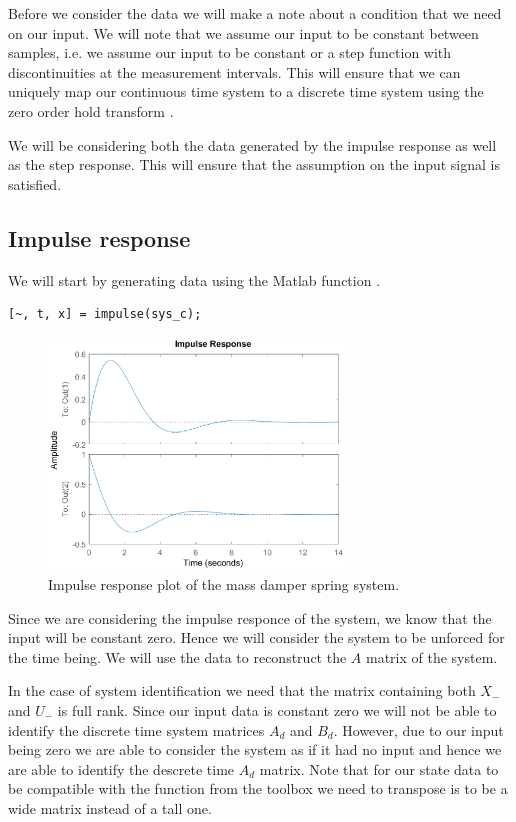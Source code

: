 Before we consider the data we will make a note about a condition that we need on our input. We will note that we assume our input to be constant between samples, i.e. we assume our input to be constant or a step function with discontinuities at the measurement intervals. This will ensure that we can uniquely map our continuous time system to a discrete time system using the zero order hold transform \cite{kollar1996equivalence}. 

We will be considering both the data generated by the impulse response as well as the step response. This will ensure that the assumption on the input signal is satisfied.

\subsection{Impulse response}
We will start by generating data using the Matlab function .

\begin{lstlisting}
[~, t, x] = impulse(sys_c);
\end{lstlisting}

\begin{figure}[H]
	\centering
	\includegraphics[width=0.7\textwidth]{impulse_response_msd.eps}
	\caption{Impulse response plot of the mass damper spring system.}
\end{figure}

Since we are considering the impulse responce of the system, we know that the input will be constant zero. Hence we will consider the system to be unforced for the time being. We will use the data to reconstruct the $A$ matrix of the system.

In the case of system identification we need that the matrix containing both $X_-$ and $U_-$ is full rank. Since our input data is constant zero we will not be able to identify the discrete time system matrices $A_d$ and $B_d$. However, due to our input being zero we are able to consider the system as if it had no input and hence we are able to identify the descrete time $A_d$ matrix. Note that for our state data to be compatible with the function from the toolbox we need to transpose is to be a wide matrix instead of a tall one.

